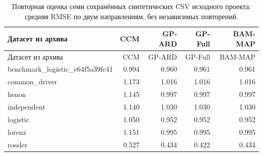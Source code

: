 \begin{longtable}{lrrrr}
\caption{Повторная оценка семи сохранённых синтетических CSV исходного проекта: средняя RMSE по двум направлениям, без независимых повторений.}\label{tab:archive}\\
\toprule
Датасет из архива & CCM & GP-ARD & GP-Full & BAM-MAP \\
\midrule
\endfirsthead
\toprule
Датасет из архива & CCM & GP-ARD & GP-Full & BAM-MAP \\
\midrule
\endhead
benchmark\_logistic\_e64f5a39fc41 & 0.994 & 0.960 & 0.961 & 0.961 \\
common\_driver & 1.173 & 1.016 & 1.016 & 1.016 \\
henon & 1.145 & 0.997 & 0.997 & 0.997 \\
independent & 1.140 & 1.030 & 1.030 & 1.030 \\
logistic & 1.050 & 0.952 & 0.952 & 0.952 \\
lorenz & 1.151 & 0.995 & 0.995 & 0.995 \\
rossler & 0.527 & 0.434 & 0.422 & 0.434 \\
\bottomrule
\end{longtable}
